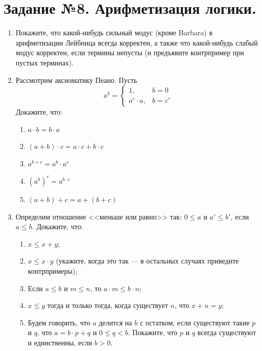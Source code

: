 \documentclass[10pt,a4paper,oneside]{article}
\begin{document}
\section*{Задание №8. Арифметизация логики.}

\begin{enumerate}
\item Покажите, что какой-нибудь сильный модус (кроме Barbara) в арифметизации Лейбница всегда
корректен, а также что какой-нибудь слабый модус корректен, если термины непусты 
(и предъявите контрпример при пустых терминах).


\item Рассмотрим аксиоматику Пеано. 
Пусть $$a^b = \left\{\begin{array}{ll}1,& b= 0 \\a^c\cdot a,&b = c'\end{array}\right.$$
Докажите, что:
\begin{enumerate}
\item $a \cdot b = b \cdot a$
\item $(a + b) \cdot c = a \cdot c + b \cdot c$
\item $a^{b+c} = a^b \cdot a^c$
\item $(a^b)^c = a^{b \cdot c}$
\item $(a + b) + c = a + (b + c)$
\end{enumerate}

\item Определим отношение <<меньше или равно>> так: $0 \le a$ и $a' \le b'$, если $a \le b$. Докажите, что:
\begin{enumerate}
\item $x \le x+y$;
\item $x \le x \cdot y$ (укажите, когда это так --- в остальных случаях приведите контрпримеры);
\item Если $a \le b$ и $m \le n$, то $a \cdot m \le b \cdot n$;
\item $x \le y$ тогда и только тогда, когда существует $n$, что $x + n = y$;
\item Будем говорить, что $a$ делится на $b$ с остатком, если существуют такие $p$ и $q$, что 
$a = b \cdot p + q$ и $0 \le q < b$. Покажите, что $p$ и $q$ всегда существуют и единственны,
если $b > 0$.
\end{enumerate}


\end{enumerate}
\end{document}
